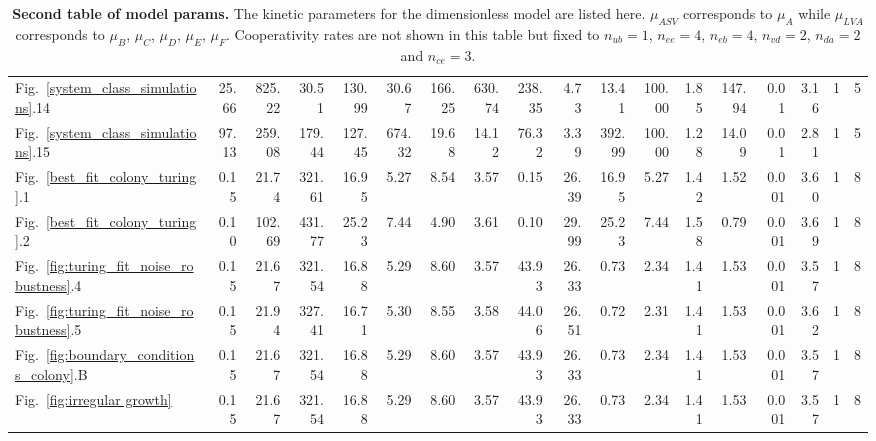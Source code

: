\begin{table}
\begin{adjustbox}{center}
\begin{tabular}{lrrrrrrrrrrrrrrrrr}
             Fig.~\ref{system_class_simulations}.14 & 25.66 & 825.22 & 30.51 & 130.99 & 30.67 & 166.25 & 630.74 & 238.35 & 4.73 & 13.41 & 100.00 & 1.85 & 147.94 & 0.01 & 3.16 & 1 & 5 \\
             Fig.~\ref{system_class_simulations}.15 & 97.13 & 259.08 & 179.44 & 127.45 & 674.32 & 19.68 & 14.12 & 76.32 & 3.39 & 392.99 & 100.00 & 1.28 & 14.09 & 0.01 & 2.81 & 1 & 5 \\
             Fig.~\ref{best_fit_colony_turing}.1 & 0.15 & 21.74 & 321.61 & 16.95 & 5.27 & 8.54 & 3.57 & 0.15 & 26.39 & 16.95 & 5.27 & 1.42 & 1.52 & 0.001 & 3.60 & 1 & 8 \\
             Fig.~\ref{best_fit_colony_turing}.2 & 0.10 & 102.69 & 431.77 & 25.23 & 7.44 & 4.90 & 3.61 & 0.10 & 29.99 & 25.23 & 7.44 & 1.58 & 0.79 & 0.001 & 3.69 & 1 & 8 \\
             Fig.~\ref{fig:turing_fit_noise_robustness}.4 & 0.15 & 21.67 & 321.54 & 16.88 & 5.29 & 8.60 & 3.57 & 43.93 & 26.33 & 0.73 & 2.34 & 1.41 & 1.53 & 0.001 & 3.57 & 1 & 8 \\
             Fig.~\ref{fig:turing_fit_noise_robustness}.5 & 0.15 & 21.94 & 327.41 & 16.71 & 5.30 & 8.55 & 3.58 & 44.06 & 26.51 & 0.72 & 2.31 & 1.41 & 1.53 & 0.001 & 3.62 & 1 & 8 \\
             Fig.~\ref{fig:boundary_conditions_colony}.B & 0.15 & 21.67 & 321.54 & 16.88 & 5.29 & 8.60 & 3.57 & 43.93 & 26.33 & 0.73 & 2.34 & 1.41 & 1.53 & 0.001 & 3.57 & 1 & 8 \\
             Fig.~\ref{fig:irregular growth} & 0.15 & 21.67 & 321.54 & 16.88 & 5.29 & 8.60 & 3.57 & 43.93 & 26.33 & 0.73 & 2.34 & 1.41 & 1.53 & 0.001 & 3.57 & 1 & 8 \\
            \bottomrule
        \end{tabular}
    \end{adjustbox}
    \caption{\textbf{Second table of model params.} The kinetic parameters for the dimensionless model are listed here. $\mu_{ASV}$ corresponds to $\mu_{A}$ while $\mu_{LVA}$ corresponds to $\mu_{B}$, $\mu_{C}$, $\mu_{D}$, $\mu_{E}$, $\mu_{F}$. Cooperativity rates are not shown in this table but fixed to $n_{ub}=1$, $n_{ee}=4$, $n_{eb}=4$, $n_{vd}=2$, $n_{da}=2$ and $n_{ce}=3$. }

    \label{tab:model_param2}
\end{table}




